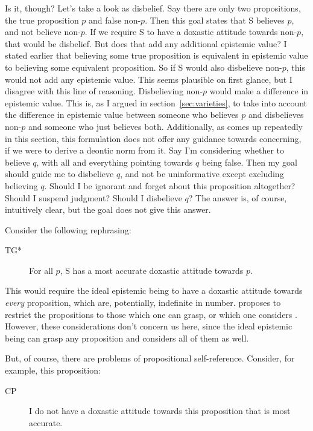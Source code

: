\documentclass[12pt,numbers=noenddot]{scrartcl}
\begin{document}
Is it, though? Let's take a look as disbelief. Say there are only two propositions, the true proposition $p$ and false non-$p$. Then this goal states that S believes $p$, and not believe non-$p$. If we require S to have a doxastic attitude towards non-$p$, that would be disbelief. But does that add any additional epistemic value? I stated earlier that believing some true proposition is equivalent in epistemic value to believing some equivalent proposition. So if S would also disbelieve non-$p$, this would not add any epistemic value. This seems plausible on first glance, but I disagree with this line of reasoning. Disbelieving non-$p$ would make a difference in epistemic value. This is, as I argued in section \ref{sec:varieties}, to take into account the difference in epistemic value between someone who believes $p$ and disbelieves non-$p$ and someone who just believes both. Additionally, as comes up repeatedly in this section, this formulation does not offer any guidance towards concerning, if we were to derive a deontic norm from it. Say I'm considering whether to believe $q$, with all and everything pointing towards $q$ being false. Then my goal should guide me to disbelieve $q$, and not be uninformative except excluding believing $q$. Should I be ignorant and forget about this proposition altogether? Should I suspend judgment? Should I disbelieve $q$? The answer is, of course, intuitively clear, but the goal does not give this answer. 

Consider the following rephrasing:

\begin{description}
    \item[TG*] For all $p$, S has a most accurate doxastic attitude towards $p$.
\end{description}

This would require the ideal epistemic being to have a doxastic attitude towards \emph{every} proposition, which are, potentially, indefinite in number. \textcite[159]{David2001-DAVTAT-7} proposes to restrict the propositions to those which one can grasp, or which one considers \autocite[17]{Chisholm1966-CHITOK}. However, these considerations don't concern us here, since the ideal epistemic being can grasp any proposition and considers all of them as well.

But, of course, there are problems of propositional self-reference. Consider, for example, this proposition:
\begin{description}
    \item[CP] I do not have a doxastic attitude towards this proposition that is most accurate.
\end{description}
\end{document}
